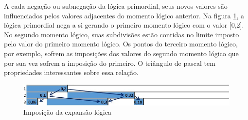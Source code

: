 A cada negação ou subnegação da lógica primordial, seus novos valores são influenciados pelos valores adjacentes do momento lógico anterior. Na figura \ref{fig:imposition_of_binomial_expansion}, a lógica primordial nega a si gerando o primeiro momento lógico com o valor [0,2].  No segundo momento lógico, suas subdivisões estão contidas no limite imposto pelo valor do primeiro momento lógico. Os pontos do terceiro momento lógico, por exemplo, sofrem as imposições dos valores do segundo momento lógico que por sua vez sofrem a imposição do primeiro. O triângulo de pascal tem propriedades interessantes sobre essa relação. 
	\begin{figure}[H]
	\caption{Imposição da expansão lógica}
	\label{fig:imposition_of_binomial_expansion}
	\centering
	\includegraphics[scale=.85]{sections/images/imposition_of_binomial_expansion.jpg}
	\end{figure}

